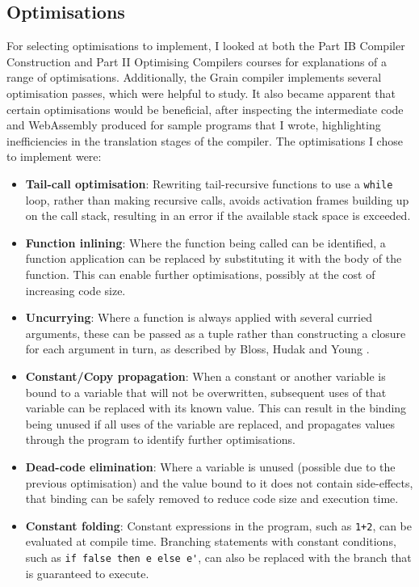 \subsection{Optimisations}
For selecting optimisations to implement, I looked at both the Part IB Compiler Construction \cite{IB-compilers} and Part II Optimising Compilers \cite{optimising-compilers} courses for explanations of a range of optimisations. Additionally, the Grain compiler implements several optimisation passes, which were helpful to study. It also became apparent that certain optimisations would be beneficial, after inspecting the intermediate code and WebAssembly produced for sample programs that I wrote, highlighting inefficiencies in the translation stages of the compiler.
The optimisations I chose to implement were:
\begin{itemize}
\item \textbf{Tail-call optimisation}: Rewriting tail-recursive functions to use a \verb|while| loop, rather than making recursive calls, avoids activation frames building up on the call stack, resulting in an error if the available stack space is exceeded.

\item \textbf{Function inlining}: Where the function being called can be identified, a function application can be replaced by substituting it with the body of the function. This can enable further optimisations, possibly at the cost of increasing code size.

\item \textbf{Uncurrying}: Where a function is always applied with several curried arguments, these can be passed as a tuple rather than constructing a closure for each argument in turn, as described by Bloss, Hudak and Young \cite{uncurry}. 

\item \textbf{Constant/Copy propagation}: When a constant or another variable is bound to a variable that will not be overwritten, subsequent uses of that variable can be replaced with its known value. This can result in the binding being unused if all uses of the variable are replaced, and propagates values through the program to identify further optimisations.

\item \textbf{Dead-code elimination}: Where a variable is unused (possible due to the previous optimisation) and the value bound to it does not contain side-effects, that binding can be safely removed to reduce code size and execution time.

\item \textbf{Constant folding}: Constant expressions in the program, such as \verb|1+2|, can be evaluated at compile time. Branching statements with constant conditions, such as \verb|if false then e else e'|, can also be replaced with the branch that is guaranteed to execute.

\end{itemize}

